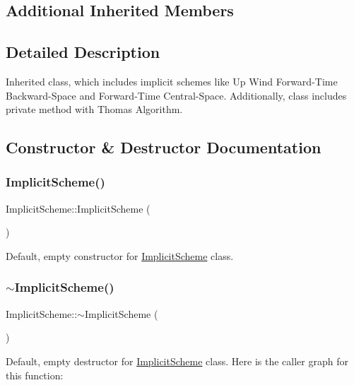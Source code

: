 \subsection*{Additional Inherited Members}


\subsection{Detailed Description}
Inherited class, which includes implicit schemes like Up Wind Forward-\/\+Time Backward-\/\+Space and Forward-\/\+Time Central-\/\+Space. Additionally, class includes private method with Thomas Algorithm. 

\subsection{Constructor \& Destructor Documentation}
\mbox{\label{class_implicit_scheme_a7bb3a64ab8d7ca0b58ed4ba9817b8c12}} 
\subsubsection{\texorpdfstring{Implicit\+Scheme()}{ImplicitScheme()}}
{\footnotesize\ttfamily Implicit\+Scheme\+::\+Implicit\+Scheme (\begin{DoxyParamCaption}{ }\end{DoxyParamCaption})}

Default, empty constructor for \mbox{\hyperlink{class_implicit_scheme}{Implicit\+Scheme}} class. \mbox{\label{class_implicit_scheme_aca61347d2335e248678f7f3060785762}} 
\subsubsection{\texorpdfstring{$\sim$\+Implicit\+Scheme()}{~ImplicitScheme()}}
{\footnotesize\ttfamily Implicit\+Scheme\+::$\sim$\+Implicit\+Scheme (\begin{DoxyParamCaption}{ }\end{DoxyParamCaption})}

Default, empty destructor for \mbox{\hyperlink{class_implicit_scheme}{Implicit\+Scheme}} class. Here is the caller graph for this function\+:


